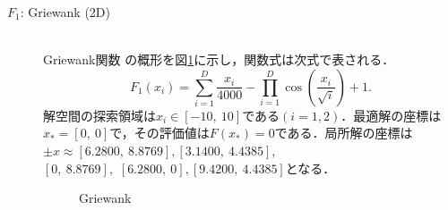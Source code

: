 \documentclass[a4j,11pt]{jarticle}
\begin{document}
\begin{description}
\item[$F_1$: Griewank (2D)]\mbox{}\\
Griewank関数 \cite{MOP} の概形を図\ref{fig:minF1}に示し，関数式は次式で表される．
\begin{equation}
\label{eq:minF1}
F_1(x_i)=\sum_{i=1}^D \frac{x_i}{4000}- \prod_{i=1}^D \cos(\frac{x_i}{\sqrt{i}})+1.
\end{equation}
解空間の探索領域は$x_i \in [-10, \ 10]$である$(i=1,2)$．最適解の座標は$x_*=[0, \ 0]$で，その評価値は$F(x_*)=0$である．局所解の座標は$\pm x \approx [6.2800, \ 8.8769], [3.1400, \ 4.4385]$, \\ $[0, \ 8.8769],$  $ [6.2800, \ 0], [9.4200, \ 4.4385]$となる．
\begin{figure}[t]
\centering
{}
\caption{Griewank}
\label{fig:minF1}
\end{figure}


\end{description}
\end{document}

